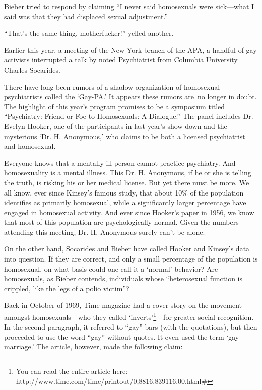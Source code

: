 \begin{refsection}
Bieber tried to respond by claiming ``I never said homosexuals were sick---what I said was that they had displaced sexual adjustment.'' 

``That's the same thing, motherfucker!'' yelled another.

Earlier this year, a meeting of the New York branch of the APA, a handful of gay activists interrupted a talk by noted Psychiatrist from Columbia University Charles Socarides.

There have long been rumors of a shadow organization of homosexual psychiatrists called the `Gay-PA.' It appears these rumors are no longer in doubt. The highlight of this year's program promises to be a symposium titled ``Psychiatry: Friend or Foe to Homosexuals: A Dialogue.'' The panel includes Dr. Evelyn Hooker, one of the participants in last year's show down and the mysterious `Dr. H. Anonymous,' who claims to be both a licensed psychiatrist and homosexual.

Everyone knows that a mentally ill person cannot practice psychiatry. And homosexuality is a mental illness. This Dr. H. Anonymous, if he or she is telling the truth, is risking his or her medical license. But yet there must be more. We all know, ever since Kinsey's famous study, that about 10\% of the population identifies as primarily homosexual, while a significantly larger percentage have engaged in homosexual activity. And ever since Hooker's paper in 1956, we know that most of this population are psychologically normal. Given the numbers attending this meeting, Dr. H. Anonymous surely can't be alone.

On the other hand, Socarides and Bieber have called Hooker and Kinsey's data into question. If they are correct, and only a small percentage of the population is homosexual, on what basis could one call it a `normal' behavior? Are homosexuals, as Bieber contends, individuals whose ``heterosexual function is crippled, like the legs of a polio victim''? 

Back in October of 1969, Time magazine had a cover story on the movement amongst homosexuals---who they called `inverts'\footnote{You can read the entire article here: http:\slash \slash www.time.com\slash time\slash printout\slash 0,8816,839116,00.html\#}---for greater social recognition. In the second paragraph, it referred to ``gay'' bars (with the quotations), but then proceeded to use the word ``gay'' without quotes. It even used the term `gay marriage.' The article, however, made the following claim:


\end{refsection}
